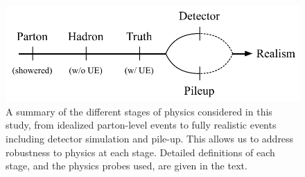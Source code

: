 \documentclass[11pt]{cernrep}
\begin{document}
\begin{figure}[t]
\begin{center}
\includegraphics[width=0.75\columnwidth]{jetsub_2prong_realism_levels}
\end{center}
\caption{A summary of the different stages of physics considered in
  this study, from idealized parton-level events to fully realistic
  events including detector simulation and pile-up.
  This allows us to
  address robustness to physics at each stage.
  Detailed definitions of
  each stage, and the physics probes used, are given in the text.
   }
\label{jetsub_2prong_fig:realism}
\end{figure}
\end{document}
